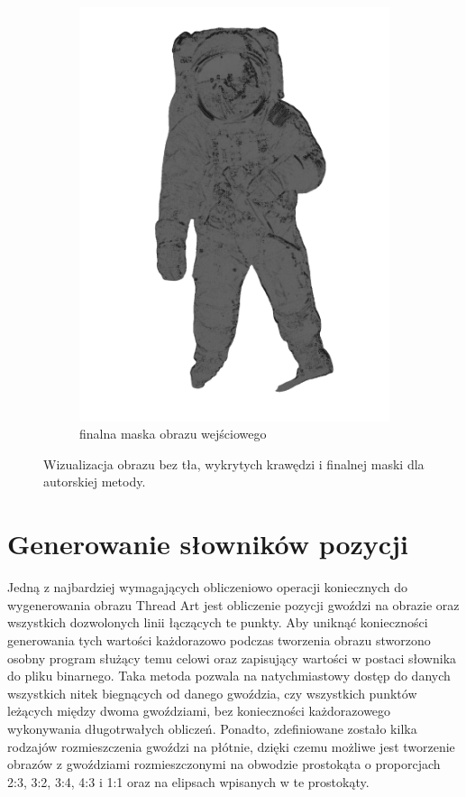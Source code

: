 \begin{figure}[htb]
\begin{subfigure}{0.32\textwidth}
            \includegraphics[width = \textwidth]{img/4-mine/input-mask.png}
            \caption{finalna maska obrazu wejściowego}
            \label{mine-input-2-c}
        \end{subfigure}
        \caption{Wizualizacja obrazu bez tła, wykrytych krawędzi i finalnej maski dla autorskiej metody.}
        \label{mine-input-2}
        \end{figure}
    
    \section{Generowanie słowników pozycji} \label{mine-dict}
    Jedną z najbardziej wymagających obliczeniowo operacji koniecznych do wygenerowania obrazu Thread Art jest obliczenie pozycji gwoździ na obrazie oraz wszystkich dozwolonych linii łączących te punkty. Aby uniknąć konieczności generowania tych wartości każdorazowo podczas tworzenia obrazu stworzono osobny program służący temu celowi oraz zapisujący wartości w postaci słownika do pliku binarnego. Taka metoda pozwala na natychmiastowy dostęp do danych wszystkich nitek biegnących od danego gwoździa, czy wszystkich punktów leżących między dwoma gwoździami, bez konieczności każdorazowego wykonywania długotrwałych obliczeń. Ponadto, zdefiniowane zostało kilka rodzajów rozmieszczenia gwoździ na płótnie, dzięki czemu możliwe jest tworzenie obrazów z gwoździami rozmieszczonymi na obwodzie prostokąta o proporcjach 2:3, 3:2, 3:4, 4:3 i 1:1 oraz na elipsach wpisanych w te prostokąty. 
    
